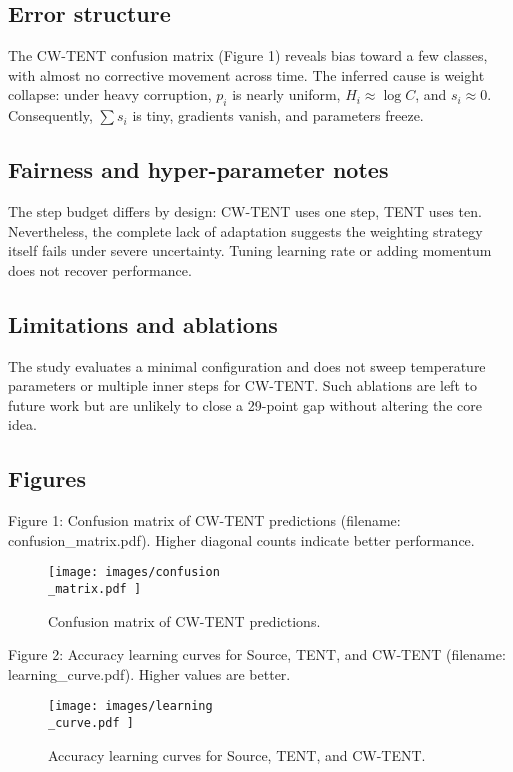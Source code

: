 \documentclass{article} %
\begin{document}
\subsection{Error structure}
The CW-TENT confusion matrix (Figure 1) reveals bias toward a few classes, with almost no corrective movement across time. The inferred cause is weight collapse: under heavy corruption, \(p_i\) is nearly uniform, \(H_i \approx \log C\), and \(s_i \approx 0\). Consequently, \(\sum s_i\) is tiny, gradients vanish, and parameters freeze.

\subsection{Fairness and hyper-parameter notes}
The step budget differs by design: CW-TENT uses one step, TENT uses ten. Nevertheless, the complete lack of adaptation suggests the weighting strategy itself fails under severe uncertainty. Tuning learning rate or adding momentum does not recover performance.

\subsection{Limitations and ablations}
The study evaluates a minimal configuration and does not sweep temperature parameters or multiple inner steps for CW-TENT. Such ablations are left to future work but are unlikely to close a 29-point gap without altering the core idea.

\subsection{Figures}
Figure 1: Confusion matrix of CW-TENT predictions (filename: confusion\_matrix.pdf). Higher diagonal counts indicate better performance.

\begin{figure}[H]
  \centering
  \texttt{[image:  images/confusion\\\_matrix.pdf ]}
  \caption{Confusion matrix of CW-TENT predictions.}
\end{figure}

Figure 2: Accuracy learning curves for Source, TENT, and CW-TENT (filename: learning\_curve.pdf). Higher values are better.

\begin{figure}[H]
  \centering
  \texttt{[image:  images/learning\\\_curve.pdf ]}
  \caption{Accuracy learning curves for Source, TENT, and CW-TENT.}
\end{figure}
\end{document}
